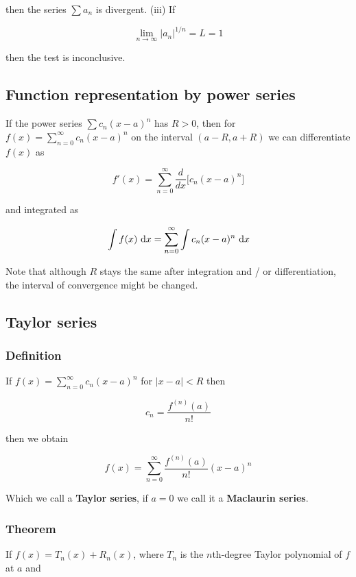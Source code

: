 \documentclass[a4paper]{article}
\begin{document}
then the series $\sum a_n$ is divergent. (iii) If 

\begin{equation}
    \lim_{n\rightarrow\infty}|a_n|^{1/n}= L = 1
\end{equation}

then the test is inconclusive.

\subsection{Function representation by power series}
If the power series $\sum c_n(x-a)^n$ has $R>0$, then for $f(x)=\sum_{n=0}^{\infty} c_n(x-a)^n$ on the interval $(a-R, a+R)$ we can differentiate $f(x)$ as

\begin{equation}
    f'(x)=\sum_{n=0}^{\infty}\frac{d}{dx}\big[c_n(x-a)^n\big]
\end{equation}

and integrated as

\begin{equation}
    \int f(x)\,\dif x=\sum_{n=0}^{\infty}\int c_n(x-a)^n\,\dif x
\end{equation}

Note that although $R$ stays the same after integration and / or differentiation, the interval of convergence might be changed.

\subsection{Taylor series}
\subsubsection*{Definition}
If  $f(x)=\sum_{n=0}^{\infty}c_n(x-a)^n$ for $|x-a|<R$ then 

\begin{equation}
    c_n=\frac{f^{(n)}(a)}{n!}
\end{equation}

then we obtain

\begin{equation}
    f(x)=\sum_{n=0}^{\infty}\frac{f^{(n)}(a)}{n!}(x-a)^n
\end{equation}

Which we call a \textbf{Taylor series}, if $a=0$ we call it a \textbf{Maclaurin series}.

\subsubsection*{Theorem}
If $f(x)=T_n(x)+R_n(x)$, where $T_n$ is the $n$th-degree Taylor polynomial of $f$ at $a$ and
\end{document}
